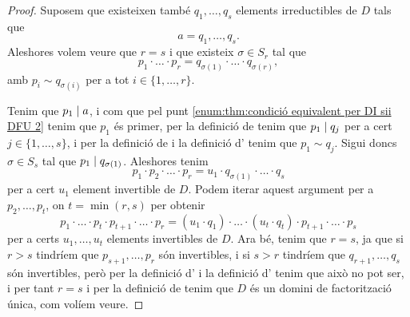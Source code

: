 \documentclass[../../Main.tex]{subfiles}
\begin{document}
\begin{theorem}
\begin{proof}
			Suposem que existeixen també \(q_{1},\dots,q_{s}\) elements irreductibles de \(D\) tals que
			\[a=q_{1},\dots,q_{s}.\]
			Aleshores volem veure que \(r=s\) i que existeix \(\sigma\in S_{r}\) tal que
			\[p_{1}\cdot\ldots\cdot p_{r}=q_{\sigma(1)}\cdot\ldots\cdot q_{\sigma(r)},\]
			amb \(p_{i}\sim q_{\sigma(i)}\) per a tot \(i\in\{1,\dots,r\}\).
			
			Tenim que \(p_{1}\mathrel{|} a\), i com que pel punt \eqref{enum:thm:condició equivalent per DI sii DFU 2} tenim que \(p_{1}\) és primer, per la definició de  tenim que \(p_{1}\mathrel{|} q_{j}\) per a cert \(j\in\{1,\dots,s\}\), i per la definició de  i la definició d' tenim que \(p_{1}\sim q_{j}\). Sigui doncs \(\sigma\in S_{s}\) tal que \(p_{1}\mathrel{|} q_{\sigma(1)}\). Aleshores tenim
			\[p_{1}\cdot p_{2}\cdot\ldots\cdot p_{r}=u_{1}\cdot q_{\sigma(1)}\cdot\ldots\cdot q_{s}\]
			per a cert \(u_{1}\) element invertible de \(D\). Podem iterar aquest argument per a \(p_{2},\dots,p_{t}\), on \(t=\min(r,s)\) per obtenir
			\[p_{1}\cdot\ldots\cdot p_{t}\cdot p_{t+1}\cdot\ldots\cdot p_{r}=(u_{1}\cdot q_{1})\cdot\ldots\cdot(u_{t}\cdot q_{t})\cdot p_{t+1}\cdot\ldots \cdot p_{s}\]
			per a certs \(u_{1},\dots, u_{t}\) elements invertibles de \(D\). Ara bé, tenim que \(r=s\), ja que si \(r>s\) tindríem que \(p_{s+1},\dots,p_{r}\) són invertibles, i si \(s>r\) tindríem que \(q_{r+1},\dots,q_{s}\) són invertibles, però per la definició d' i la definició d' tenim que això no pot ser, i per tant \(r=s\) i per la definició de  tenim que \(D\) és un domini de factorització única, com volíem veure.
		\end{proof}
	\end{theorem}
\end{document}
